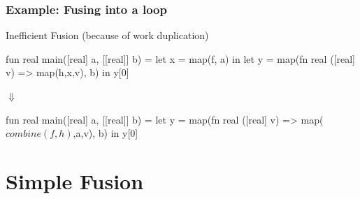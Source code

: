 \documentclass{beamer}
\newcommand{\mymath}[1]{$ #1 $}
\begin{document}
\begin{frame}[fragile,t]
  \frametitle{Example: Fusing into a loop}

  \begin{block}{Inefficient Fusion (because of work duplication)}
\begin{center}
      \begin{colorcode}[fontsize=\scriptsize]
fun real main([real] a, [[real]] b) =
let x      = map(f, a)                 in
let y      = map(fn real ([real] v) =>
                 map(h,x,v), b)        in
y[0]
      \end{colorcode}
$\Downarrow$
      \begin{colorcode}[fontsize=\scriptsize]
fun real main([real] a, [[real]] b) =
let y      = map(fn real ([real] v) =>
                 map(\mymath{combine(f,h)},a,v), b) in
y[0]
      \end{colorcode}
\end{center}
  \end{block}
\end{frame}

\section{Simple Fusion}
\end{document}
